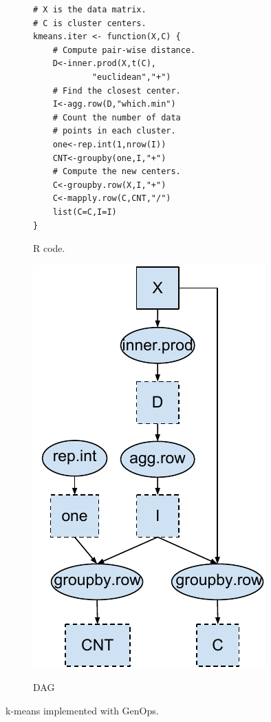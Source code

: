 \begin{figure}
\centering
	\footnotesize
	\begin{subfigure}{.25\textwidth}
	\vspace{20pt}
	\centering
	\begin{verbatim}
# X is the data matrix.
# C is cluster centers.
kmeans.iter <- function(X,C) {
	# Compute pair-wise distance.
	D<-inner.prod(X,t(C),
			"euclidean","+")
	# Find the closest center.
	I<-agg.row(D,"which.min")
	# Count the number of data
	# points in each cluster.
	one<-rep.int(1,nrow(I))
	CNT<-groupby(one,I,"+")
	# Compute the new centers.
	C<-groupby.row(X,I,"+")
	C<-mapply.row(C,CNT,"/")
	list(C=C,I=I)
}
	\end{verbatim}
	\label{fig:code}
	\caption{R code.}
	\hspace{20pt}
	\end{subfigure}%
	\begin{subfigure}{.25\textwidth}
	\centering
	\includegraphics[scale=0.5]{FlashMatrix_figs/DAG.pdf}
	\label{fig:dag}
	\vspace{-4pt}
	\caption{DAG}
	\end{subfigure}
  \vspace{-12pt}
	\caption{k-means implemented with GenOps.}
	\label{fig:kmeans}
  \vspace{-8pt}
\end{figure}

